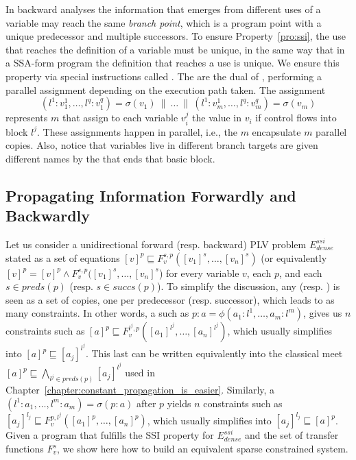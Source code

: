 In backward analyses the information that emerges from different uses of a variable may reach the same {\em branch point}, which is a program point with a unique predecessor and multiple successors.
To ensure Property~\ref{pro:ssi}, the use that reaches the definition of a
variable must be unique, in the same way that in a SSA-form program the definition that reaches a use is unique.
We ensure this property via special instructions called \sigmafuns.
The \sigmafuns are the dual of \phifuns, performing a parallel assignment depending on the execution path taken.
The assignment \[(l^1:v_1^1, \ldots, l^q:v_1^q) = \sigma(v_1) \ \parallel\  \dots \ \parallel\  (l^1:v_m^1, \ldots, l^q:v_m^q) = \sigma(v_m)\] represents $m$ \sigmafuns that assign to each variable $v_i^j$ the value in $v_i$ if control flows into block $l^j$.
These assignments happen in parallel, i.e., the $m$ \sigmafuns encapsulate $m$ parallel copies.
Also, notice that variables live in different branch targets are given
different names by the \sigmafun that ends that basic block.

\subsection{Propagating Information Forwardly and Backwardly}
\label{sec:ssi:pereira:engine}

Let us consider a unidirectional forward (resp. backward) PLV problem $E^{\textit{ssi}}_{\textit{dense}}$ stated as a set of equations $[v]^p \sqsubseteq  F_v^{s,p}([v_1]^s, \dots, [v_n]^s)$ (or equivalently $[v]^p = [v]^p \wedge    F_v^{s,p}([v_1]^s, \dots, [v_n]^s$) for every variable $v$, each \progpoint $p$, and each $s \in \textit{preds}(p)$ (resp. $s \in \textit{succs}(p)$). 
To simplify the discussion, any \phifun (resp. \sigmafun) is seen as a set of copies, one per predecessor (resp. successor), which leads to as many constraints.
In other words, a \phifun such as $p:a=\phi(a_1:l^1,\dots,a_m:l^m)$, gives us $n$ constraints such as $[a]^p \sqsubseteq  F_v^{l^j,p}([a_1]^{l^j}, \dots, [a_n]^{l^j})$, which usually simplifies into $[a]^p \sqsubseteq [a_j]^{l^j}$. This last can be written equivalently into the classical meet $[a]^p \sqsubseteq \bigwedge_{l^j \in \textit{preds}(p)} [a_j]^{l^j}$ used in Chapter~\ref{chapter:constant_propagation_is_easier}.
Similarly, a \sigmafun $(l^1:a_1,\dots,l^m:a_m)=\sigma(p:a)$ after \progpoint $p$ yields $n$ constraints such as $[a_j]^{l_j} \sqsubseteq  F_v^{p,l^j}([a_1]^p, \dots, [a_n]^p)$, which usually simplifies into $[a_j]^{l_j} \sqsubseteq [a]^p$.
Given a program that fulfills the SSI property for $E^{\textit{ssi}}_{\textit{dense}}$ and the set of transfer functions $F_v^s$, we show here how to build an equivalent sparse constrained system.  

